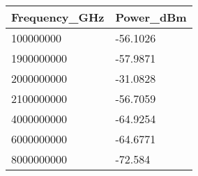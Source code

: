 \begin{tabular}{ll}
Frequency_GHz & Power_dBm \\ 
\hline 
100000000 & -56.1026 \\ 
1900000000 & -57.9871 \\ 
2000000000 & -31.0828 \\ 
2100000000 & -56.7059 \\ 
4000000000 & -64.9254 \\ 
6000000000 & -64.6771 \\ 
8000000000 & -72.584 \\ 
\hline 
\end{tabular}